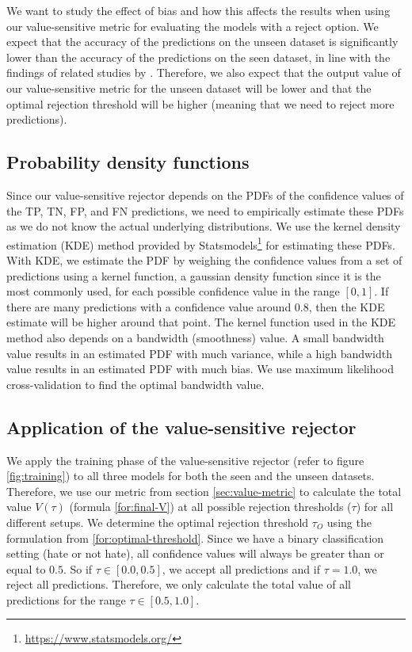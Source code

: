 %
We want to study the effect of bias and how this affects the results when using our value-sensitive metric for evaluating the models with a reject option.
%
We expect that the accuracy of the predictions on the unseen dataset is significantly lower than the accuracy of the predictions on the seen dataset, in line with the findings of related studies by \citet{grondahl2018all, arango2019hate}.
%
Therefore, we also expect that the output value of our value-sensitive metric for the unseen dataset will be lower and that the optimal rejection threshold will be higher (meaning that we need to reject more predictions).
%

\subsection{Probability density functions}
Since our value-sensitive rejector depends on the PDFs of the confidence values of the TP, TN, FP, and FN predictions, we need to empirically estimate these PDFs as we do not know the actual underlying distributions.
%
We use the kernel density estimation (KDE) method provided by Statsmodels\footnote{\url{https://www.statsmodels.org/}} for estimating these PDFs.
%
With KDE, we estimate the PDF by weighing the confidence values from a set of predictions using a kernel function, a gaussian density function since it is the most commonly used, for each possible confidence value in the range $[0, 1]$.
%
If there are many predictions with a confidence value around $0.8$, then the KDE estimate will be higher around that point.
%
The kernel function used in the KDE method also depends on a bandwidth (smoothness) value.
%
A small bandwidth value results in an estimated PDF with much variance, while a high bandwidth value results in an estimated PDF with much bias.
%
We use maximum likelihood cross-validation to find the optimal bandwidth value.

\subsection{Application of the value-sensitive rejector}
\label{sec:rejector-application}
We apply the training phase of the value-sensitive rejector (refer to figure \ref{fig:training}) to all three models for both the seen and the unseen datasets.
%
Therefore, we use our metric from section \ref{sec:value-metric} to calculate the total value $V(\tau)$ (formula \ref{for:final-V}) at all possible rejection thresholds ($\tau$) for all different setups.
%
We determine the optimal rejection threshold $\tau_O$ using the formulation from \ref{for:optimal-threshold}.
%
Since we have a binary classification setting (hate or not hate), all confidence values will always be greater than or equal to $0.5$.
%
So if $\tau \in [0.0, 0.5]$, we accept all predictions and if $\tau = 1.0$, we reject all predictions.
%
Therefore, we only calculate the total value of all predictions for the range $\tau \in [0.5, 1.0]$.
%

